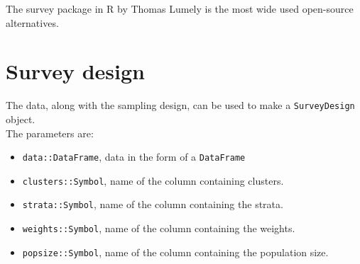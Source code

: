 \documentclass{juliacon}
\begin{document}
The survey package in R by Thomas Lumely \cite{lumley2004analysis} is the most wide used open-source alternatives. 



\section{Survey design}

The data, along with the sampling design, can be used to make a \verb|SurveyDesign| object.
\\
The parameters are:
 
\begin{itemize}
    \item \verb|data::DataFrame|, data in the form of a \verb|DataFrame|
    \item \verb|clusters::Symbol|, name of the column containing clusters.
    \item \verb|strata::Symbol|, name of the column containing the strata.
    \item \verb|weights::Symbol|, name of the column containing the weights.
    \item \verb|popsize::Symbol|, name of the column containing the population size. 
\end{itemize}






\end{document}
